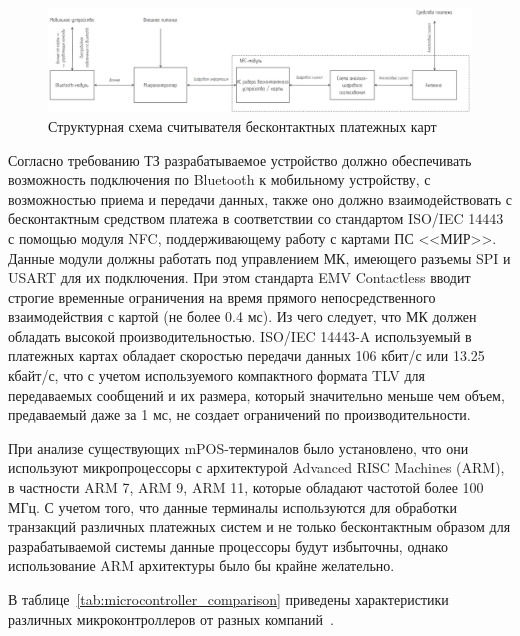 \begin{figure}[h]
    \centering
    \includegraphics[width=1\textwidth]{images/design/apparat_struct}
    \caption{\centering Структурная схема считывателя бесконтактных платежных карт}
    \label{fig:apparat_struct}
\end{figure}


Согласно требованию ТЗ разрабатываемое устройство должно обеспечивать возможность подключения по Bluetooth к мобильному устройству, с возможностью приема и передачи данных, также оно должно взаимодействовать с бесконтактным средством платежа в соответствии со стандартом ISO/IEC 14443 с помощью модуля NFC, поддерживающему работу с картами ПС <<МИР>>.
Данные модули должны работать под управлением МК, имеющего разъемы SPI и USART для их подключения.
При этом стандарта EMV Contactless вводит строгие временные ограничения на время прямого непосредственного взаимодействия с картой (не более 0.4 мс).
Из чего следует, что МК должен обладать высокой производительностью.
ISO/IEC 14443-A используемый в платежных картах обладает скоростью передачи данных 106 кбит/с или 13.25 кбайт/с, что с учетом используемого компактного формата TLV для передаваемых сообщений и их размера, который значительно меньше чем объем, предаваемый даже за 1 мс, не создает ограничений по производительности.

При анализе существующих mPOS-терминалов было установлено, что они используют микропроцессоры с архитектурой Advanced RISC Machines (ARM), в частности ARM 7, ARM 9, ARM 11, которые обладают частотой более 100 МГц.
С учетом того, что данные терминалы используются для обработки транзакций различных платежных систем и не только бесконтактным образом для разрабатываемой системы данные процессоры будут избыточны, однако использование ARM архитектуры было бы крайне желательно.

В таблице~\ref{tab:microcontroller_comparison} приведены характеристики различных микроконтроллеров от разных компаний~\cite{stm32f103_datasheet}\cite{atmega328p_datasheet}.


